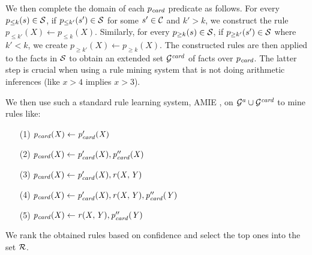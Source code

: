 We then complete the domain of each $p_{\mathit{card}}$ predicate as follows. For every $p_{\leq k}(s)\in \mathcal{S}$, if $p_{\leq k'}(s')\in\mathcal{S}$ for some $s'\in \mathcal{C}$ and $k' > k$, we construct the rule $ p_{\leq k'}(X)\leftarrow p_{\leq k}(X).$ Similarly, for every $p_{\geq k}(s)\in\mathcal{S}$, if $p_{\geq k'}(s')\in \mathcal{S}$ where $k' < k$, we create $p_{\geq k'}(X)\leftarrow p_{\geq k}(X)$.
The constructed rules are then applied to the facts in $\mathcal{S}$ to obtain an extended set $\mathcal{G}^{\mathit{card}}$ of facts over $p_{\mathit{card}}$. The latter step is crucial when using a rule mining system that is not doing arithmetic inferences (like $x>4$ implies $x>3$).

 We then use such a standard rule learning system, AMIE \cite{amie}, on $\mathcal{G}^a \cup \mathcal{G}^{\mathit{card}}$ to mine rules like:
 
\vspace{-\topsep}
\small{
 \begin{itemize}
\item[(1)] $\mathit{p_{card}(X)\leftarrow p'_{card}(X)}$
\item[(2)] $\mathit{p_{card}(X)\leftarrow p'_{card}(X), p''_{card}(X)}$
\item[(3)] $\mathit{p_{card}(X)\leftarrow p'_{card}(X), r(X,Y)}$
\item[(4)] $\mathit{p_{card}(X)\leftarrow p'_{card}(X), r(X,Y)},\mathit{p''_{card}(Y)}$
\item[(5)] $\mathit{p_{card}(X)\leftarrow r(X,Y), p''_{card}(Y)}$
\end{itemize}
}\normalsize
\vspace{-\topsep}
\noindent We rank the obtained %
rules based on confidence %
and select the top %
ones into the set $\mathcal{R}$.

